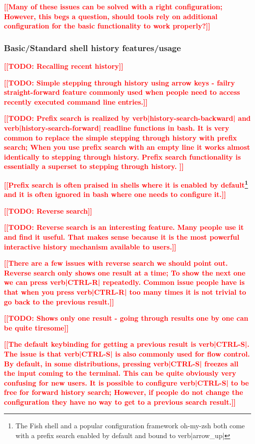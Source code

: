 \documentclass[thesis=M,english]{FITthesis}[2012/10/20]
\newcommand{\todotext}[1]{\textcolor{red}{\textbf{[[#1]]}}}
\begin{document}
\todotext{Many of these issues can be solved with a right configuration; However, this begs a question, should tools rely on additional configuration for the basic functionality to work properly?}


\subsubsection*{Basic/Standard shell history features/usage}

\todotext{TODO: Recalling recent history}

\todotext{TODO: Simple stepping through history using arrow keys - failry straight-forward feature commonly used when people need to access recently executed command line entries.}

\todotext{TODO: Prefix search is realized by verb|history-search-backward| and verb|history-search-forward| readline functions in bash. It is very common to replace the simple stepping through history with prefix search; When you use prefix search with an empty line it works almost identically to stepping through history. Prefix search functionality is essentially a superset to stepping through history. }


\todotext{Prefix search is often praised in shells where it is enabled by default\footnote{The Fish shell and a popular configuration framework oh-my-zsh both come with a prefix search enabled by default and bound to verb|arrow\_up|} and it is often ignored in bash where one needs to configure it.}

\todotext{TODO: Reverse search}

\todotext{TODO: Reverse search is an interesting feature. Many people use it and find it useful. That makes sense because it is the most powerful interactive history mechanism available to users.} 

\todotext{There are a few issues with reverse search we should point out. Reverse search only shows one result at a time; To show the next one we can press verb|CTRL-R| repeatedly. Common issue people have is that when you press verb|CTRL-R| too many times it is not trivial to go back to the previous result.}

\todotext{TODO: Shows only one result - going through results one by one can be quite tiresome}

\todotext{The default keybinding for getting a previous result is verb|CTRL-S|. The issue is that verb|CTRL-S| is also commonly used for flow control. By default, in some distributions, pressing verb|CTRL-S| freezes all the input coming to the terminal. This can be quite obviously very confusing for new users. It is possible to configure verb|CTRL-S| to be free for forward history search; However, if people do not change the configuration they have no way to get to a previous search result.}
\end{document}
